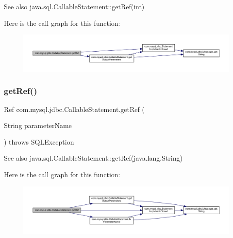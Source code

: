 \begin{DoxySeeAlso}{See also}
java.\+sql.\+Callable\+Statement\+::get\+Ref(int) 
\end{DoxySeeAlso}
Here is the call graph for this function\+:\nopagebreak
\begin{figure}[H]
\begin{center}
\leavevmode
\includegraphics[width=350pt]{classcom_1_1mysql_1_1jdbc_1_1_callable_statement_a8c00f111b4c99ac186f1b25164c8f97a_cgraph}
\end{center}
\end{figure}
\mbox{\label{classcom_1_1mysql_1_1jdbc_1_1_callable_statement_a2e8c60ffce328cdca3f615add21e7ea4}} 
\subsubsection{\texorpdfstring{get\+Ref()}{getRef()}\hspace{0.1cm}{\footnotesize\ttfamily [2/2]}}
{\footnotesize\ttfamily Ref com.\+mysql.\+jdbc.\+Callable\+Statement.\+get\+Ref (\begin{DoxyParamCaption}\item[{String}]{parameter\+Name }\end{DoxyParamCaption}) throws S\+Q\+L\+Exception}

\begin{DoxySeeAlso}{See also}
java.\+sql.\+Callable\+Statement\+::get\+Ref(java.\+lang.\+String) 
\end{DoxySeeAlso}
Here is the call graph for this function\+:\nopagebreak
\begin{figure}[H]
\begin{center}
\leavevmode
\includegraphics[width=350pt]{classcom_1_1mysql_1_1jdbc_1_1_callable_statement_a2e8c60ffce328cdca3f615add21e7ea4_cgraph}
\end{center}
\end{figure}
\mbox{\label{classcom_1_1mysql_1_1jdbc_1_1_callable_statement_aa7732fb063990b1e3719aa6d33f0ba7c}} 
